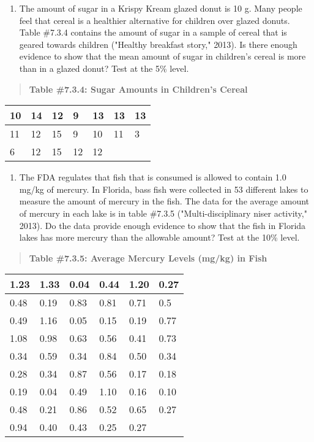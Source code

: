\documentclass[]{book}
\providecommand{\tightlist}{%
  \setlength{\itemsep}{0pt}\setlength{\parskip}{0pt}}
\begin{document}
\begin{enumerate}
\def\labelenumi{\arabic{enumi}.}
\setcounter{enumi}{1}
\tightlist
\item
  The amount of sugar in a Krispy Kream glazed donut is 10 g. Many
  people feel that cereal is a healthier alternative for children over
  glazed donuts. Table \#7.3.4 contains the amount of sugar in a
  sample of cereal that is geared towards children ("Healthy
  breakfast story," 2013). Is there enough evidence to show that the
  mean amount of sugar in children's cereal is more than in a glazed
  donut? Test at the 5\% level.
\end{enumerate}

\begin{quote}
\textbf{Table \#7.3.4: Sugar Amounts in Children's Cereal}
\end{quote}

\begin{longtable}[]{@{}lllllll@{}}
\toprule
10 & 14 & 12 & 9 & 13 & 13 & 13\tabularnewline
\midrule
\endhead
11 & 12 & 15 & 9 & 10 & 11 & 3\tabularnewline
6 & 12 & 15 & 12 & 12 & &\tabularnewline
\bottomrule
\end{longtable}

\begin{enumerate}
\def\labelenumi{\arabic{enumi}.}
\setcounter{enumi}{2}
\tightlist
\item
  The FDA regulates that fish that is consumed is allowed to contain
  1.0 mg/kg of mercury. In Florida, bass fish were collected in 53
  different lakes to measure the amount of mercury in the fish. The
  data for the average amount of mercury in each lake is in table
  \#7.3.5 ("Multi-disciplinary niser activity," 2013). Do the data
  provide enough evidence to show that the fish in Florida lakes has
  more mercury than the allowable amount? Test at the 10\% level.
\end{enumerate}

\begin{quote}
\textbf{Table \#7.3.5: Average Mercury Levels (mg/kg) in Fish}
\end{quote}

\begin{longtable}[]{@{}llllll@{}}
\toprule
1.23 & 1.33 & 0.04 & 0.44 & 1.20 & 0.27\tabularnewline
\midrule
\endhead
0.48 & 0.19 & 0.83 & 0.81 & 0.71 & 0.5\tabularnewline
0.49 & 1.16 & 0.05 & 0.15 & 0.19 & 0.77\tabularnewline
1.08 & 0.98 & 0.63 & 0.56 & 0.41 & 0.73\tabularnewline
0.34 & 0.59 & 0.34 & 0.84 & 0.50 & 0.34\tabularnewline
0.28 & 0.34 & 0.87 & 0.56 & 0.17 & 0.18\tabularnewline
0.19 & 0.04 & 0.49 & 1.10 & 0.16 & 0.10\tabularnewline
0.48 & 0.21 & 0.86 & 0.52 & 0.65 & 0.27\tabularnewline
0.94 & 0.40 & 0.43 & 0.25 & 0.27 &\tabularnewline
\bottomrule
\end{longtable}
\end{document}
